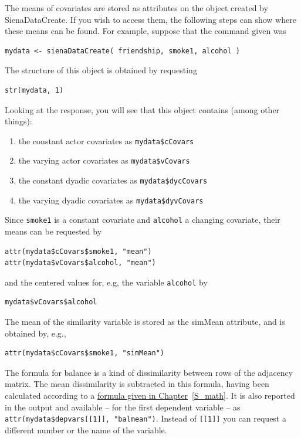 \documentclass[a4paper,fleqn,11pt]{article}
\newcommand{\+}{\, + \,}
\newcommand{\sfn}[1]{\textsf{#1}}
\begin{document}
The means of covariates are stored as attributes on the object created by
\sfn{SienaDataCreate}.
If you wish to access them, the following steps can show
where these means can be found.
For example, suppose that the command given was
\begin{verbatim}
mydata <- sienaDataCreate( friendship, smoke1, alcohol )
\end{verbatim}
The structure of this object is obtained by requesting
\begin{verbatim}
str(mydata, 1)
\end{verbatim}
Looking at the response, you
will see that this object contains (among other things):
\begin{enumerate}
\item the constant actor covariates as \texttt{mydata\$cCovars}
\item the varying actor covariates as \texttt{mydata\$vCovars}
\item the constant dyadic covariates as \texttt{mydata\$dycCovars}
\item the varying dyadic covariates as \texttt{mydata\$dyvCovars}
\end{enumerate}
Since \texttt{smoke1} is a constant covariate and \texttt{alcohol}
a changing covariate, their means can be requested by
\begin{verbatim}
attr(mydata$cCovars$smoke1, "mean")
attr(mydata$vCovars$alcohol, "mean")
\end{verbatim}
and the centered values for, e.g, the variable \texttt{alcohol} by
\begin{verbatim}
mydata$vCovars$alcohol
\end{verbatim}
The mean of the similarity variable is stored as the \sfn{simMean} attribute,
and is obtained by, e.g.,
\begin{verbatim}
attr(mydata$cCovars$smoke1, "simMean")
\end{verbatim}

The formula for balance is a kind of dissimilarity between rows of
the adjacency matrix. The mean dissimilarity is subtracted in this
formula, having been calculated according to a
\hyperlink{T_meanbal}{formula given in Chapter}~\ref{S_math}.
It is also reported in the output and available -- for the first
dependent variable -- as \texttt{attr(mydata\$depvars[[1]], "balmean")}.
Instead of \texttt{[[1]]} you can request a different number or
the name of the variable.

\end{document}
